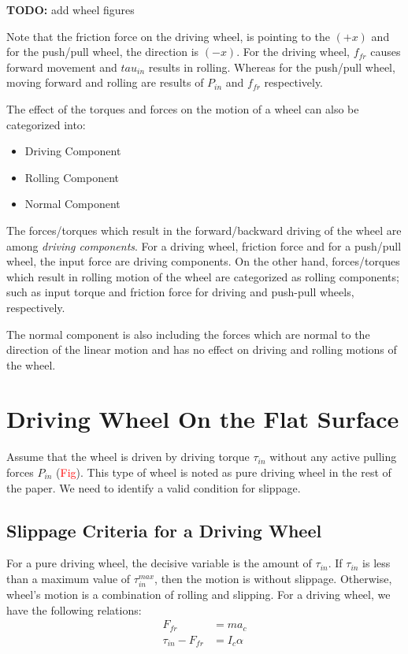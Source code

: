 \documentclass[letterpaper, 10pt, conference]{ieeeconf}
\newcommand{\TODO}[1]{{\color{red} {\bf TODO:} {#1}}}
\begin{document}
\TODO{add wheel figures}

Note that the friction force on the driving wheel, is pointing to the $(+x)$ and for the push/pull wheel, the direction is $(-x)$. For the driving wheel, $f_{fr}$ causes forward movement and $tau_{in}$ results in rolling. Whereas for the push/pull wheel, moving forward and rolling are results of $P_{in}$ and $f_{fr}$ respectively.

The effect of the torques and forces on the motion of a wheel can also be categorized into:
\begin{itemize}
\item Driving Component
\item Rolling Component
\item Normal Component
\end{itemize}

The forces/torques which result in the forward/backward driving of the wheel are among \emph{driving components}. For a driving wheel, friction force and for a push/pull wheel, the input force are driving components. On the other hand, forces/torques which result in rolling motion of the wheel are categorized as rolling components; such as input torque and friction force for driving and push-pull wheels, respectively.

The normal component is also including the forces which are normal to the direction of the linear motion and has no effect on driving and rolling motions of the wheel.
\section{Driving Wheel On the Flat Surface} \label{DrivingWheel}

Assume that the wheel is driven by driving torque $\tau_{in}$ without any active pulling forces $P_{in}$ (\textcolor{red}{Fig}). This type of wheel is noted as pure driving wheel in the rest of the paper. We need to identify a valid condition for slippage. 

\subsection{Slippage Criteria for a Driving Wheel} \label{SlipCri-DW}

For a pure driving wheel, the decisive variable is the amount of $\tau_{in}$. If $\tau_{in}$ is less than a maximum value of $\tau_{in}^{max}$, then the motion is without slippage. Otherwise, wheel's motion is a combination of rolling and slipping. For a driving wheel, we have the following relations:
\begin{align}
F_{fr} &= ma_c \label{f_fr}\\
\tau_{in} - F_{fr} &= I_c \alpha \label{moment_eq}
\end{align}
\end{document}

